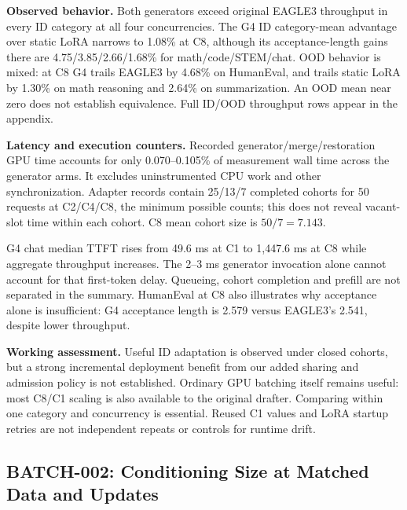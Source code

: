 


\textbf{Observed behavior.} Both generators exceed original EAGLE3 throughput
in every ID category at all four concurrencies. The G4 ID category-mean advantage
over static LoRA narrows to 1.08\% at C8, although its acceptance-length gains
there are 4.75/3.85/2.66/1.68\% for math/code/STEM/chat. OOD behavior is mixed:
at C8 G4 trails EAGLE3 by 4.68\% on HumanEval, and trails static LoRA by 1.30\%
on math reasoning and 2.64\% on summarization. An OOD mean near zero does not
establish equivalence. Full ID/OOD throughput rows appear in the appendix.

\textbf{Latency and execution counters.} Recorded generator/merge/restoration
GPU time accounts for only 0.070--0.105\% of measurement wall time across the
generator arms. It excludes uninstrumented CPU work and other synchronization.
Adapter records contain 25/13/7 completed cohorts for 50 requests at C2/C4/C8,
the minimum possible counts; this does not reveal vacant-slot time within each
cohort. C8 mean cohort size is $50/7=7.143$.



G4 chat median TTFT rises from 49.6 ms at C1 to 1,447.6 ms at C8 while aggregate
throughput increases. The 2--3 ms generator invocation alone cannot account
for that first-token delay. Queueing, cohort completion and prefill are not
separated in the summary. HumanEval at C8 also illustrates why acceptance alone
is insufficient: G4 acceptance length is 2.579 versus EAGLE3's 2.541, despite
lower throughput.

\textbf{Working assessment.} Useful ID adaptation is observed under closed
cohorts, but a strong incremental deployment benefit from our added sharing
and admission policy is not established. Ordinary GPU batching itself remains
useful: most C8/C1 scaling is also available to the original drafter. Comparing
within one category and concurrency is essential. Reused C1 values and LoRA
startup retries are not independent repeats or controls for runtime drift.

\subsection{BATCH-002: Conditioning Size at Matched Data and Updates}

